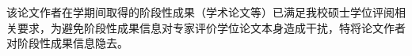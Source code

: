 \begin{resume}

  该论文作者在学期间取得的阶段性成果（学术论文等）已满足我校硕士学位评阅相关要求，为避免阶段性成果信息对专家评价学位论文本身造成干扰，特将论文作者对阶段性成果信息隐去。
  
\end{resume}